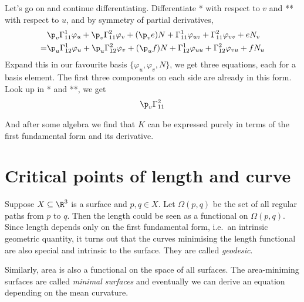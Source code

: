 \documentclass[a4paper]{article}
\begin{document}
Let's go on and continue differentiating. Differentiate * with respect to \(v\) and ** with respect to \(u\), and by symmetry of partial derivatives,
\begin{align*}
  &\p_v \Gamma_{11}^1 \varphi_u + \p_v \Gamma_{11}^2 \varphi_v + (\p_v e) N + \Gamma_{11}^1 \varphi_{uv} + \Gamma_{11}^2 \varphi_{vv} + e N_v \\
  =& \p_u \Gamma_{12}^1 \varphi_u + \p_u \Gamma_{12}^2 \varphi_v + (\p_u f) N + \Gamma_{12}^1 \varphi_{uu} + \Gamma_{12}^2 \varphi_{vu} + f N_u
\end{align*}
Expand this in our favourite basis \(\{\varphi_u, \varphi_v, N\}\), we get three equations, each for a basis element. The first three components on each side are already in this form. Look up in * and **, we get
\begin{align*}
  \p_v \Gamma_{11}^2
\end{align*}

\blindtext

And after some algebra we find that \(K\) can be expressed purely in terms of the first fundamental form and its derivative.

\section{Critical points of length and curve}

Suppose \(X \subseteq \R^3\) is a surface and \(p, q \in X\). Let \(\Omega(p, q)\) be the set of all regular paths from \(p\) to \(q\). Then the length could be seen as a functional on \(\Omega(p, q)\). Since length depends only on the first fundamental form, i.e.\ an intrinsic geometric quantity, it turns out that the curves minimising the length functional are also special and intrinsic to the surface. They are called \emph{geodesic}.

Similarly, area is also a functional on the space of all surfaces. The area-miniming surfaces are called \emph{minimal surfaces} and eventually we can derive an equation depending on the mean curvature.



\printindex

\iffalse
Classical differential geometry concerning geometries of curves and surfaces, from a modern point of view

Contents:
I: notions of smmoth \(k\)-dim manifolds. We study differential topology.

Geometry is concerned with the study of rigid motions

invariants of curves: \(k\) curvature, \(\tau\) torsion
invariant of surfaces: \(K\) mean curvature, \(K\) Gaussian curvature
\fi
\end{document}
